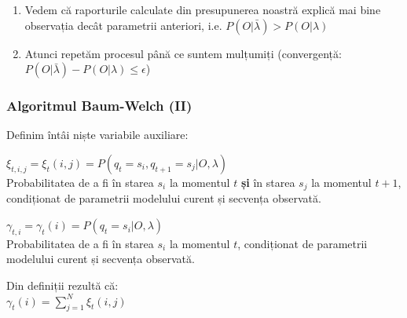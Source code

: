 \begin{frame}[fragile, t]
{\begin{enumerate}
		\item Vedem că raporturile calculate din presupunerea noastră explică mai bine observația decât parametrii
				anteriori, i.e. $P(O \vert \bar{\lambda}) > P(O \vert \lambda) $%
		\vspace*{0.25em}
		\pause
		\item Atunci repetăm procesul până ce suntem mulțumiți (convergență: 
				$P(O \vert \bar{\lambda}) - P(O \vert \lambda) \le \epsilon$)
	\end{enumerate}
	}
\end{frame}

\begin{frame}[t]
	\frametitle{Algoritmul Baum-Welch (II)}
	\pause
	Definim întâi niște variabile auxiliare:
	
	\begin{block}{}    
    	$\xi_{t,i,j} = \xi_t(i,j) = P(q_t=s_i,q_{t+1}=s_j \vert O, \lambda)$\\
    	Probabilitatea de a fi în starea $s_i$ la momentul $t$ \textbf{și} în starea $s_j$ la momentul $t+1$,
    	condiționat de parametrii modelului curent și secvența observată.
	\end{block}
	\pause
	
	\begin{block}{}    
    	$ \gamma_{t,i} = \gamma_t(i) = P(q_t = s_i \vert O, \lambda)$\\
    	Probabilitatea de a fi în starea $s_i$ la momentul $t$, condiționat de parametrii modelului curent și 
    	secvența observată.
	\end{block}
	\vspace*{1em}
	\pause
	
	Din definiții rezultă că:\\
	$ \gamma_t(i) = \displaystyle\sum_{j=1}^{N}\xi_t(i,j)$
  	
\end{frame}

